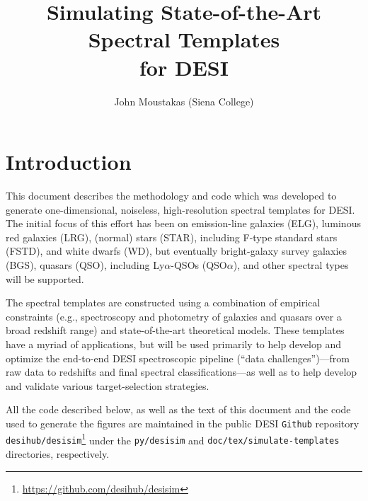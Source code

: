 \documentclass[12pt]{article}
\begin{document}
\title{Simulating State-of-the-Art Spectral Templates \\ for DESI} 


\author{John Moustakas (Siena College)}
\maketitle


\section{Introduction}

This document describes the methodology and code which was developed to generate
one-dimensional, noiseless, high-resolution spectral templates for DESI.  The
initial focus of this effort has been on emission-line galaxies (ELG), luminous
red galaxies (LRG), (normal) stars (STAR), including F-type standard stars
(FSTD), and white dwarfs (WD), but eventually bright-galaxy survey galaxies
(BGS), quasars (QSO), including Ly$\alpha$-QSOs (QSO$\alpha$), and other
spectral types will be supported.

The spectral templates are constructed using a combination of empirical
constraints (e.g., spectroscopy and photometry of galaxies and quasars over a
broad redshift range) and state-of-the-art theoretical models.  These templates
have a myriad of applications, but will be used primarily to help develop and
optimize the end-to-end DESI spectroscopic pipeline (``data challenges'')---from
raw data to redshifts and final spectral classifications---as well as to help
develop and validate various target-selection strategies.

All the code described below, as well as the text of this document and the code
used to generate the figures are maintained in the public DESI {\tt Github}
repository {\tt
  desihub/desisim}\footnote{\url{https://github.com/desihub/desisim}} under the
{\tt py/desisim} and {\tt doc/tex/simulate-templates} directories, respectively.

\end{document}
